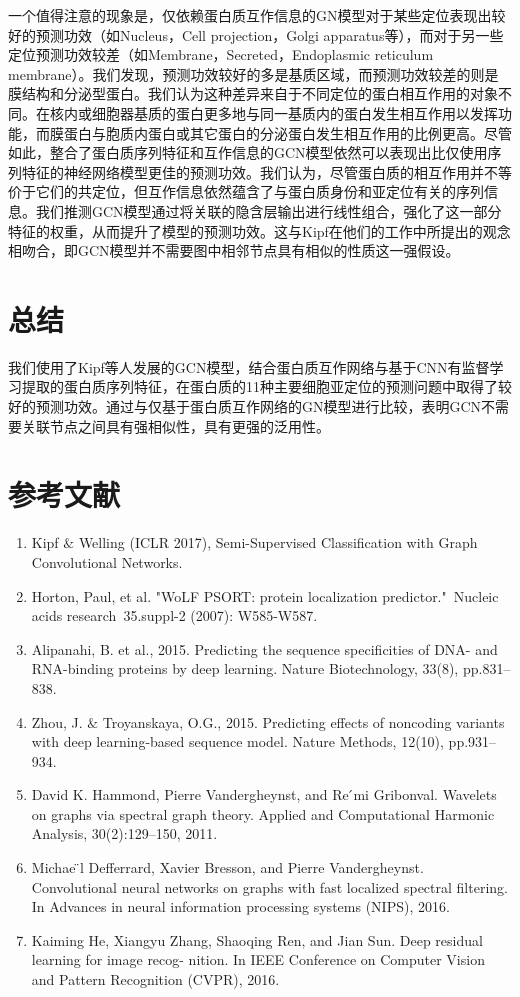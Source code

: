 \documentclass[a4paper,UTF8]{article}
\begin{document}
一个值得注意的现象是，仅依赖蛋白质互作信息的GN模型对于某些定位表现出较好的预测功效（如Nucleus，Cell projection，Golgi apparatus等），而对于另一些定位预测功效较差（如Membrane，Secreted，Endoplasmic reticulum membrane）。我们发现，预测功效较好的多是基质区域，而预测功效较差的则是膜结构和分泌型蛋白。我们认为这种差异来自于不同定位的蛋白相互作用的对象不同。在核内或细胞器基质的蛋白更多地与同一基质内的蛋白发生相互作用以发挥功能，而膜蛋白与胞质内蛋白或其它蛋白的分泌蛋白发生相互作用的比例更高。尽管如此，整合了蛋白质序列特征和互作信息的GCN模型依然可以表现出比仅使用序列特征的神经网络模型更佳的预测功效。我们认为，尽管蛋白质的相互作用并不等价于它们的共定位，但互作信息依然蕴含了与蛋白质身份和亚定位有关的序列信息。我们推测GCN模型通过将关联的隐含层输出进行线性组合，强化了这一部分特征的权重，从而提升了模型的预测功效。这与Kipf在他们的工作中所提出的观念相吻合，即GCN模型并不需要图中相邻节点具有相似的性质这一强假设。

\section{总结}

我们使用了Kipf等人发展的GCN模型，结合蛋白质互作网络与基于CNN有监督学习提取的蛋白质序列特征，在蛋白质的11种主要细胞亚定位的预测问题中取得了较好的预测功效。通过与仅基于蛋白质互作网络的GN模型进行比较，表明GCN不需要关联节点之间具有强相似性，具有更强的泛用性。

\section{参考文献}
\begin{enumerate}[(1)]
	\item Kipf $\&$ Welling (ICLR 2017), Semi-Supervised Classification with Graph Convolutional Networks.
	\item Horton, Paul, et al. "WoLF PSORT: protein localization predictor." Nucleic acids research 35.suppl-2 (2007): W585-W587.
	\item Alipanahi, B. et al., 2015. Predicting the sequence specificities of DNA- and RNA-binding proteins by deep learning. Nature Biotechnology, 33(8), pp.831–838.
	\item Zhou, J. $\&$ Troyanskaya, O.G., 2015. Predicting effects of noncoding variants with deep learning-based sequence model. Nature Methods, 12(10), pp.931–934.
	\item David K. Hammond, Pierre Vandergheynst, and Re ́mi Gribonval. Wavelets on graphs via spectral graph theory. Applied and Computational Harmonic Analysis, 30(2):129–150, 2011.
	\item Michae ̈l Defferrard, Xavier Bresson, and Pierre Vandergheynst. Convolutional neural networks on graphs with fast localized spectral filtering. In Advances in neural information processing systems (NIPS), 2016.
	\item 
	Kaiming He, Xiangyu Zhang, Shaoqing Ren, and Jian Sun. Deep residual learning for image recog- nition. In IEEE Conference on Computer Vision and Pattern Recognition (CVPR), 2016.

\end{enumerate}
 
%
%
\end{document}
